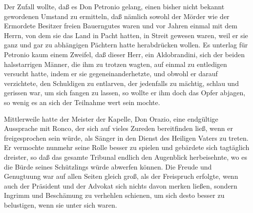 Der Zufall wollte, daß es Don Petronio gelang, einen bisher nicht
bekannt gewordenen Umstand zu ermitteln, daß nämlich sowohl der
Mörder wie der Ermordete Besitzer freien Bauerngutes waren und vor
Jahren einmal mit dem Herrn, von dem sie das Land in Pacht hatten,
in Streit gewesen waren, weil er sie ganz und gar zu abhängigen
Pächtern hatte herabdrücken wollen. Es unterlag für Petronio kaum
einem Zweifel, daß dieser Herr, ein Aldobrandini, sich der beiden
halsstarrigen Männer, die ihm zu trotzen wagten, auf einmal zu
entledigen versucht hatte, indem er sie gegeneinanderhetzte, und
obwohl er darauf verzichtete, den Schuldigen zu entlarven, der
jedenfalls zu mächtig, schlau und gerissen war, um sich fangen zu
lassen, so wollte er ihm doch das Opfer abjagen, so wenig es an
sich der Teilnahme wert sein mochte.

Mittlerweile hatte der Meister der Kapelle, Don Orazio, eine
endgültige Aussprache mit Ronco, der sich auf vieles Zureden
bereitfinden ließ, wenn er freigesprochen sein würde, als Sänger in
den Dienst des Heiligen Vaters zu treten. Er vermochte nunmehr
seine Rolle besser zu spielen und gebärdete sich tagtäglich
dreister, so daß das gesamte Tribunal endlich den Augenblick
herbeisehnte, wo es die Bürde seines Schützlings würde abwerfen
können. Die Freude und Genugtuung war auf allen Seiten gleich groß,
als der Freispruch erfolgte, wenn auch der Präsident und der
Advokat sich nichts davon merken ließen, sondern Ingrimm und
Beschämung zu verhehlen schienen, um sich desto besser zu
belustigen, wenn sie unter sich waren.

